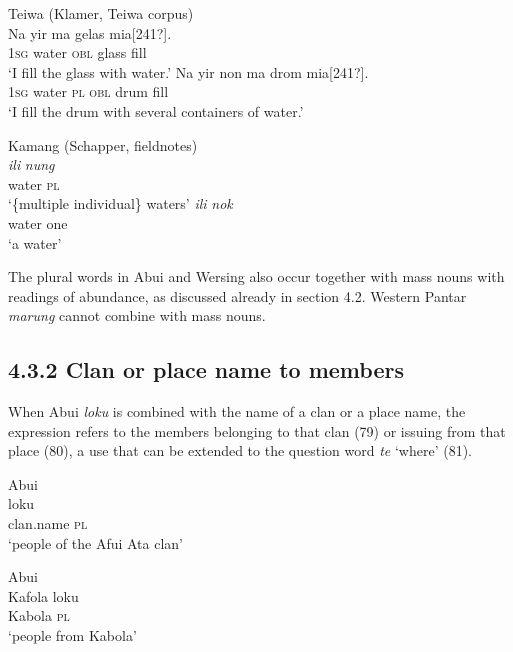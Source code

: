 \ea%
\label{ex:77}
Teiwa (Klamer, Teiwa corpus)\\
\ea
\gll  Na yir ma gelas {mia}{[241?]}{.} \\
    \textsc{1sg} water \textsc{obl} glass fill \\
\glt `I fill the glass with water.'
\ex
\gll Na yir non ma drom {mia}{[241?]}{.} \\
   \textsc{1sg} water \textsc{pl} \textsc{obl} drum fill  \\
\glt  `I fill the drum with several containers of water.'
\z
\z







\ea%
\label{ex:78}
Kamang (Schapper, fieldnotes)\\
\ea
\gll\textit{ili} \textit{nung} \\
   water \textsc{pl} \\
 \glt `\{multiple individual\} waters'
 \ex
 \gll \textit{ili} \textit{nok}\\
  water one\\
\glt `a water'
\z
\z

The plural words in Abui and Wersing also occur together with mass nouns with readings of abundance, as discussed already in section 4.2. Western Pantar \textit{marung} cannot combine with mass nouns.

\subsection{\textup{4.3.2 Clan or place name to members}\textup{} }
When Abui \textit{loku} is combined with the name of a clan or a place name, the expression refers to the members belonging to that clan (79) or issuing from that place (80), a use that can be extended to the question word \textit{te} `where' (81).


\ea%
\label{ex:79}
Abui \citep[165]{Kratochvil2007}\\
 loku \\
   clan.name \textsc{pl}  \\
\glt `people of the Afui Ata clan'
\z







\ea%
\label{ex:80}
Abui \citep[166]{Kratochvil2007}\\
\gll  Kafola  loku \\
    Kabola  \textsc{pl} \\
\glt `people from Kabola'
\z







